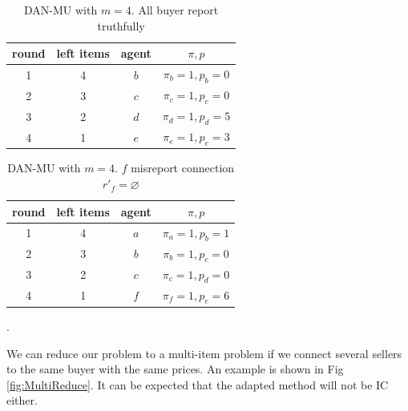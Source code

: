 \begin{itemize}
        \begin{table}[htbp]
          \begin{tabular}{c|c|c|c}
            round & left items & agent & \(\pi, p\)             \\
            \hline
            1     & 4          & \(b\) & \(\pi_b = 1, p_b = 0\) \\
            2     & 3          & \(c\) & \(\pi_c = 1, p_c = 0\) \\
            3     & 2          & \(d\) & \(\pi_d = 1, p_d = 5\) \\
            4     & 1          & \(e\) & \(\pi_e = 1, p_e = 3\) \\
            \hline
          \end{tabular}
          \caption{DAN-MU with \(m = 4\). All buyer report truthfully\cite{MUDAN-MUDAR}}
          \label{table:DAN-MUTruthful}
        \end{table}
        \begin{table}[htbp]
          \begin{tabular}{c|c|c|c}
            round & left items & agent & \(\pi, p\)             \\
            \hline
            1     & 4          & \(a\) & \(\pi_a = 1, p_b = 1\) \\
            2     & 3          & \(b\) & \(\pi_b = 1, p_c = 0\) \\
            3     & 2          & \(c\) & \(\pi_c = 1, p_d = 0\) \\
            4     & 1          & \(f\) & \(\pi_f = 1, p_e = 6\) \\
            \hline
          \end{tabular}
          \caption{DAN-MU with \(m = 4\). \(f\) misreport connection \(r'_f = \varnothing\)\cite{MUDAN-MUDAR}}
          \label{table:DAN-MUMisreport}.
        \end{table}
\end{itemize}
We can reduce our
problem to a multi-item problem if we connect several sellers to the same buyer with the same prices.
An example is shown in Fig \ref*{fig:MultiReduce}. It can be expected that the adapted method will not be IC either.\par
